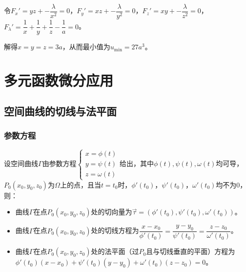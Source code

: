 \documentclass[UTF8, 12pt]{ctexart}
\begin{document}
令$F_x'=yz+-\dfrac{\lambda}{x^2}=0$，$F_y'=xz+-\dfrac{\lambda}{y^2}=0$，$F_z'=xy+-\dfrac{\lambda}{z^2}=0$，$F_\lambda'=\dfrac{1}{x}+\dfrac{1}{y}+\dfrac{1}{z}-\dfrac{1}{a}=0$。

解得$x=y=z=3a$，从而最小值为$u_{\min}=27a^3$。



\section{多元函数微分应用}

\subsection{空间曲线的切线与法平面}

\subsubsection{参数方程}

设空间曲线$\varGamma$由参数方程$\left\{\begin{array}{l}
    x=\phi(t) \\
    y=\psi(t) \\
    z=\omega(t)
\end{array}\right.$给出，其中$\phi(t),\psi(t),\omega(t)$均可导，$P_0(x_0,y_0,z_0)$为$\varOmega$上的点，且当$t=t_0$时，$\phi'(t_0)$，$\psi'(t_0)$，$\omega'(t_0)$均不为0，则：

\begin{itemize}
    \item 曲线$\varGamma$在点$P_0(x_0,y_0,z_0)$处的切向量为$\vec{\tau}=(\phi'(t_0),\psi'(t_0),\omega'(t_0))$。
    \item 曲线$\varGamma$在点$P_0(x_0,y_0,z_0)$处的切线方程为$\dfrac{x-x_0}{\phi'(t_0)}=\dfrac{y-y_0}{\psi'(t_0)}=\dfrac{z-z_0}{\omega'(t_0)}$。
    \item 曲线$\varGamma$在点$P_0(x_0,y_0,z_0)$处的法平面（过$P_0$且与切线垂直的平面）方程为$\phi'(t_0)(x-x_0)+\psi'(t_0)(y-y_0)+\omega'(t_0)(z-z_0)=0$。
\end{itemize}
\end{document}
